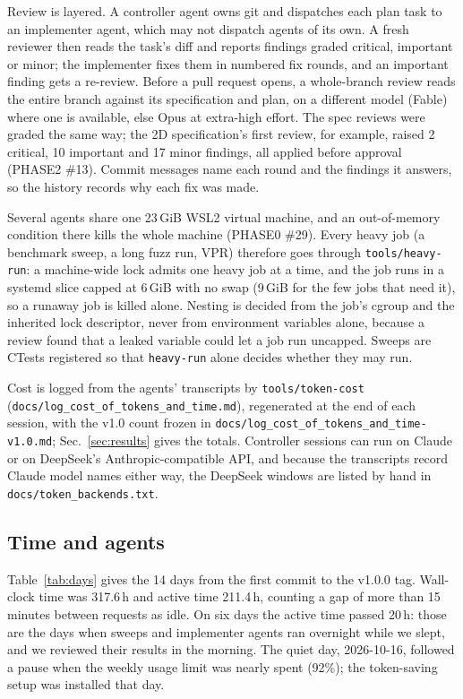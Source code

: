 \documentclass[conference]{IEEEtran}
\newcommand{\code}[1]{\texttt{#1}}
\begin{document}
Review is layered. A controller agent owns git and dispatches each plan task to an implementer
agent, which may not dispatch agents of its own. A fresh reviewer then reads the task's diff and
reports findings graded critical, important or minor; the implementer fixes them in numbered
fix rounds, and an important finding gets a re-review. Before a pull request opens, a
whole-branch review reads the entire branch against its specification and plan, on a different
model (Fable) where one is available, else Opus at extra-high effort. The spec reviews were graded the same way; the 2D
specification's first review, for example, raised 2 critical, 10 important and 17 minor
findings, all applied before approval (PHASE2 \#13). Commit messages name each round and the
findings it answers, so the history records why each fix was made.

Several agents share one 23\,GiB WSL2 virtual machine, and an out-of-memory condition there kills
the whole machine (PHASE0 \#29). Every heavy job (a benchmark sweep, a long fuzz run, VPR)
therefore goes through \code{tools/heavy-run}: a machine-wide lock admits one heavy job at a
time, and the job runs in a systemd slice capped at 6\,GiB with no swap (9\,GiB for the few
jobs that need it), so a runaway job is killed alone. Nesting is decided from the job's cgroup
and the inherited lock descriptor, never from environment variables alone, because a review
found that a leaked variable could let a job run uncapped. Sweeps are CTests registered so that \code{heavy-run}
alone decides whether they may run.

Cost is logged from the agents' transcripts by \code{tools/token-cost}
(\code{docs/log\_cost\_of\_tokens\_and\_time.md}), regenerated at the end of each session, with the
v1.0 count frozen in \code{docs/log\_cost\_of\_tokens\_and\_time-v1.0.md};
Sec.~\ref{sec:results} gives the totals. Controller sessions can run on Claude or on DeepSeek's
Anthropic-compatible API, and because the transcripts record Claude model names either way, the
DeepSeek windows are listed by hand in \code{docs/token\_backends.txt}.

\subsection{Time and agents}
\label{sec:time-agents}
Table~\ref{tab:days} gives the 14 days from the first commit to the v1.0.0 tag. Wall-clock time
was 317.6\,h and active time 211.4\,h, counting a gap of more than 15 minutes between requests as
idle. On six days the active time passed 20\,h: those are the days when sweeps and implementer
agents ran overnight while we slept, and we reviewed their results in the morning. The quiet day,
2026-10-16, followed a pause when the weekly usage limit was nearly spent (92\%); the token-saving
setup was installed that day.
\end{document}
